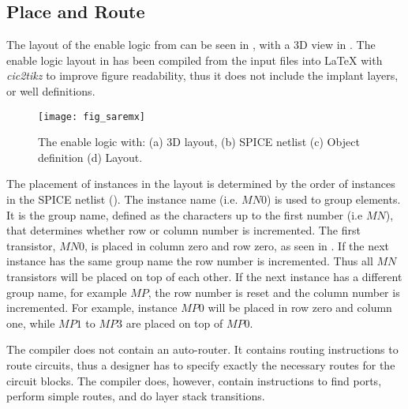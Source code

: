 \subsection{Place and Route} \label{placeroute}
The layout of the enable logic from  can be seen in
,  with a 3D view \cite{GDS3D} in
. The enable logic layout in  has been compiled from the  input files into
{\LaTeX} \cite{latex16} with \textit{cic2tikz} \cite{ciccreator16}  to improve figure
readability, thus it does not include the implant layers, or well definitions.
\begin{figure*}[t]
  \centerline{\texttt{[image: fig\_saremx]}}
\caption[Caption without FN]{The enable logic with: (a)  3D layout, (b) SPICE netlist (c) Object definition (d) Layout.}
\label{fig_sarmx}
\end{figure*}

The placement of instances in the
layout is determined by the order of instances in the SPICE netlist
(). The
instance name (i.e. $MN0$) is used to
group elements. It is the group name, defined as the characters up to
the first number (i.e $MN$), that determines whether row or column number
is incremented.  The first transistor, $MN0$, is placed in
column zero and row zero, as seen in . If the next instance has the same group name the
row number is incremented. Thus all $MN$ transistors will be placed on
top of each other. If the
next instance has a different group name, for example $MP$, the row
number is reset and the column number is incremented. For example, instance
$MP0$ will be placed in row zero and column one, while $MP1$ to $MP3$
 are placed on top of $MP0$.

The compiler does not contain an auto-router. It contains
routing instructions to route circuits, thus a designer has to specify exactly the
necessary routes for the circuit blocks. The compiler does, however, contain
instructions to find ports, perform simple routes, and do layer stack
transitions.

